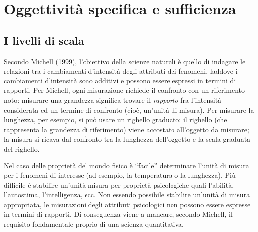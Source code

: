 \chapter{Oggettività specifica e sufficienza }
\label{chapter:ogg_specifica} 


%


\section{I livelli di scala}

Secondo Michell (1999), l'obiettivo della scienze naturali è quello di indagare le relazioni tra i cambiamenti d'intensità degli attributi dei fenomeni, laddove i cambiamenti d'intensità sono additivi e possono essere espressi in termini di rapporti. Per Michell, ogni misurazione richiede il confronto con un riferimento noto: misurare una grandezza significa trovare il {\it rapporto} fra l'intensità considerata ed un termine di confronto (cioè, un'unità di misura).
Per misurare la lunghezza, per esempio, si può usare un righello graduato: il righello (che rappresenta la grandezza di riferimento) viene accostato all'oggetto da misurare; la misura si ricava dal confronto tra la lunghezza dell'oggetto e la scala graduata del righello.

Nel caso delle proprietà  del mondo fisico è ``facile'' determinare l'unità di misura  per i fenomeni di interesse (ad esempio, la temperatura o la lunghezza). Più difficile è stabilire un'unità misura per proprietà psicologiche quali l'abilità, l'autostima, l'intelligenza, ecc. Non essendo possibile stabilire un'unità di misura appropriata, le misurazioni degli attributi psicologici non possono essere espresse in termini di rapporti. Di conseguenza viene a mancare, secondo Michell, il requisito fondamentale proprio di una scienza quantitativa.

